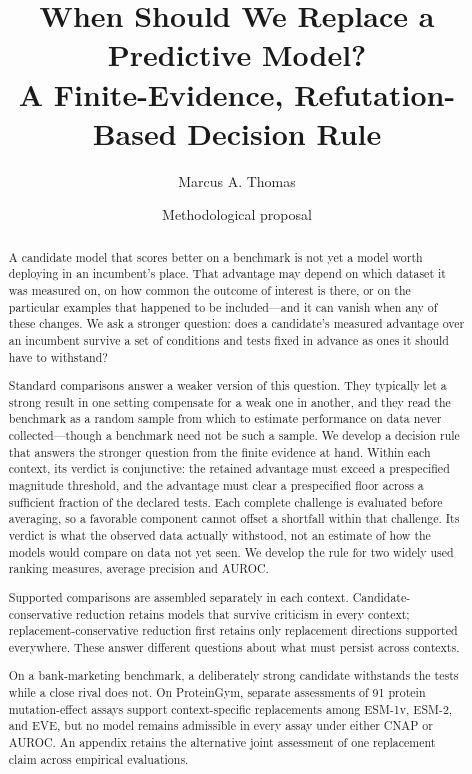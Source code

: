 \documentclass[11pt]{article}
\title{When Should We Replace a Predictive Model?\\
\large A Finite-Evidence, Refutation-Based Decision Rule}
\author{Marcus A. Thomas}
\date{Methodological proposal}
\theoremstyle{remark}
\begin{document}
\maketitle

\begin{abstract}
A candidate model that scores better on a benchmark is not yet a model worth
deploying in an incumbent's place. That advantage may depend on which dataset it
was measured on, on how common the outcome of interest is there, or on the
particular examples that happened to be included---and it can vanish when any of
these changes. We ask a stronger question: does a candidate's measured advantage
over an incumbent survive a set of conditions and tests fixed in advance as ones
it should have to withstand?

Standard comparisons answer a weaker version of this question. They typically
let a strong result in one setting compensate for a weak one in another, and
they read the benchmark as a random sample from which to estimate performance on
data never collected---though a benchmark need not be such a sample. We develop a
decision rule that answers the stronger question from the finite evidence at
hand. Within each context, its verdict is conjunctive: the retained advantage must exceed a
prespecified magnitude threshold, and the advantage must clear a prespecified
floor across a sufficient fraction of the declared tests. Each complete challenge is evaluated before averaging, so a favorable
component cannot offset a shortfall within that challenge. Its verdict is
what the observed data actually withstood, not an estimate of how the models
would compare on data not yet seen. We develop the rule for two widely used
ranking measures, average precision and AUROC.

Supported comparisons are assembled separately in each context.
Candidate-conservative reduction retains models that survive criticism in
every context; replacement-conservative reduction first retains only
replacement directions supported everywhere. These answer different questions
about what must persist across contexts.

On a bank-marketing benchmark, a deliberately
strong candidate withstands the tests while a close rival does not. On
ProteinGym, separate assessments of 91 protein mutation-effect assays support
context-specific replacements among ESM-1v, ESM-2, and EVE, but no model
remains admissible in every assay under either CNAP or AUROC. An appendix
retains the alternative joint assessment of one replacement claim across
empirical evaluations.
\end{abstract}
\end{document}
